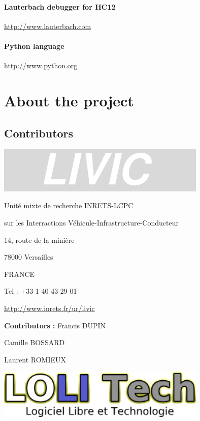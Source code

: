 \documentclass[12pt,twoside]{article}
\begin{document}
\paragraph{Lauterbach debugger for HC12}
\href{http://www.lauterbach.com/}{http://www.lauterbach.com}

\paragraph{Python language}
\href{http://www.python.org/}{http://www.python.org}

\clearpage\section{About the project}
\subsection{Contributors }
 \begin{center}
   \includegraphics[width=10cm]{Pictures/1000020100000258000000832C6FFAB4.png}
\end{center}

Unit\'e mixte de recherche INRETS{}-LCPC

sur les Interractions V\'ehicule{}-Infrastructure{}-Conducteur

14, route de la mini\`ere

78000 Versailles

FRANCE

Tel : +33 1 40 43 29 01

\href{http://www.inrets.fr/ur/livic}{http://www.inrets.fr/ur/livic}

\textbf{Contributors :} Francis DUPIN

   Camille BOSSARD

   Laurent ROMIEUX


\bigskip

 \begin{center}
   \includegraphics[width=10cm]{Pictures/100002010000013A0000004A96B0C1FF.png}
\end{center}
\end{document}
